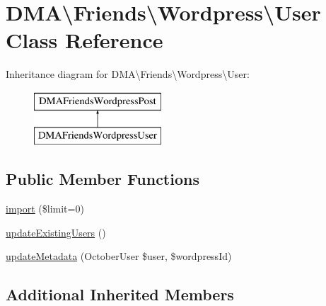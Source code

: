 \hypertarget{classDMA_1_1Friends_1_1Wordpress_1_1User}{\section{D\+M\+A\textbackslash{}Friends\textbackslash{}Wordpress\textbackslash{}User Class Reference}
\label{classDMA_1_1Friends_1_1Wordpress_1_1User}
}
Inheritance diagram for D\+M\+A\textbackslash{}Friends\textbackslash{}Wordpress\textbackslash{}User\+:\begin{figure}[H]
\begin{center}
\leavevmode
\includegraphics[height=2.000000cm]{dd/d73/classDMA_1_1Friends_1_1Wordpress_1_1User}
\end{center}
\end{figure}
\subsection*{Public Member Functions}
\begin{DoxyCompactItemize}
\item 
\hyperlink{classDMA_1_1Friends_1_1Wordpress_1_1User_ab33f393b12ecbd1a7a274a041006348f}{import} (\$limit=0)
\item 
\hyperlink{classDMA_1_1Friends_1_1Wordpress_1_1User_a9664b94f73cb6ed82746b94d9bdac91b}{update\+Existing\+Users} ()
\item 
\hyperlink{classDMA_1_1Friends_1_1Wordpress_1_1User_aa2d2c2c9b82db76a0eab7af41629e011}{update\+Metadata} (October\+User \$user, \$wordpress\+Id)
\end{DoxyCompactItemize}
\subsection*{Additional Inherited Members}


